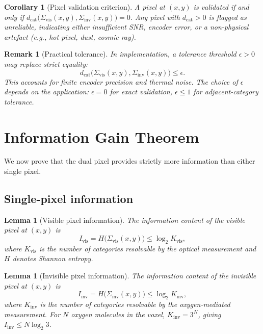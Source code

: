 \documentclass[11pt,twocolumn,a4paper]{article}
\newtheorem{lemma}[theorem]{Lemma}
\newtheorem{corollary}[theorem]{Corollary}
\newtheorem{remark}{Remark}
\newcommand{\Sigvis}{\Sigma_{\mathrm{vis}}}
\newcommand{\Siginv}{\Sigma_{\mathrm{inv}}}
\newcommand{\dcat}{d_{\mathrm{cat}}}
\begin{document}
\begin{corollary}[Pixel validation criterion]\label{cor:validation}
A pixel at $(x,y)$ is validated if and only if $\dcat\bigl(\Sigvis(x,y), \Siginv(x,y)\bigr) = 0$.
Any pixel with $\dcat > 0$ is flagged as unreliable, indicating either insufficient SNR, encoder error, or a non-physical artefact (e.g., hot pixel, dust, cosmic ray).
\end{corollary}

\begin{remark}[Practical tolerance]
In implementation, a tolerance threshold $\epsilon > 0$ may replace strict equality:
\begin{equation}
\dcat\bigl(\Sigvis(x,y), \Siginv(x,y)\bigr) \leq \epsilon.
\end{equation}
This accounts for finite encoder precision and thermal noise.
The choice of $\epsilon$ depends on the application: $\epsilon = 0$ for exact validation, $\epsilon \leq 1$ for adjacent-category tolerance.
\end{remark}


\section{Information Gain Theorem}\label{sec:information}

We now prove that the dual pixel provides strictly more information than either single pixel.

\subsection{Single-pixel information}

\begin{lemma}[Visible pixel information]\label{lem:vis_info}
The information content of the visible pixel at $(x,y)$ is
\begin{equation}\label{eq:vis_info}
I_{\mathrm{vis}} = H\bigl(\Sigvis(x,y)\bigr) \leq \log_2 K_{\mathrm{vis}},
\end{equation}
where $K_{\mathrm{vis}}$ is the number of categories resolvable by the optical measurement and $H$ denotes Shannon entropy.
\end{lemma}

\begin{lemma}[Invisible pixel information]\label{lem:inv_info}
The information content of the invisible pixel at $(x,y)$ is
\begin{equation}\label{eq:inv_info}
I_{\mathrm{inv}} = H\bigl(\Siginv(x,y)\bigr) \leq \log_2 K_{\mathrm{inv}},
\end{equation}
where $K_{\mathrm{inv}}$ is the number of categories resolvable by the oxygen-mediated measurement.
For $N$ oxygen molecules in the voxel, $K_{\mathrm{inv}} = 3^N$, giving $I_{\mathrm{inv}} \leq N\log_2 3$.
\end{lemma}
\end{document}
